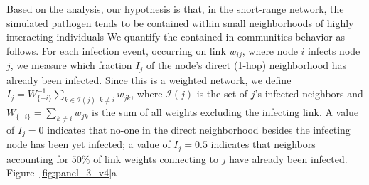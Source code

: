 \documentclass[fleqn,10pt]{wlscirep}
\begin{document}
Based on the  analysis, our hypothesis is that, in the short-range network, the simulated pathogen tends to be contained within small neighborhoods of highly interacting individuals 
We quantify the contained-in-communities behavior as follows.
For each infection event, occurring on link $w_{ij}$, where node $i$ infects node $j$, we measure which fraction $I_j$ of the node's direct (1-hop) neighborhood has already been infected.
Since this is a weighted network, we define $I_j=W_{\{-i\}}^{-1}\sum_{k \in \mathcal{I}(j), k\neq i} w_{jk}$, where $\mathcal{I}(j)$ is the set of $j$'s infected neighbors and $W_{\{-i\}} = \sum_{k\neq i} w_{jk}$ is the sum of all weights excluding the infecting link.
A value of $I_j = 0$ indicates that no-one in the direct neighborhood besides the infecting node has been yet infected; a value of $I_j = 0.5$ indicates that neighbors accounting for $50\%$ of link weights connecting to $j$ have already been infected.
Figure~\ref{fig:panel_3_v4}a 
\end{document}
